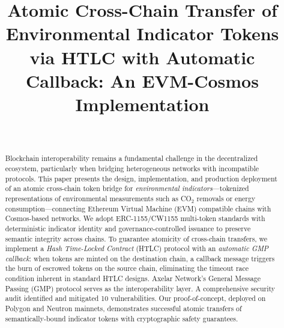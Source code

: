 \documentclass[conference,10pt]{IEEEtran}
\begin{document}
\title{Atomic Cross-Chain Transfer of Environmental Indicator Tokens via HTLC with Automatic Callback: An EVM-Cosmos Implementation}

\author{
    \\
}

\maketitle

\begin{abstract}
Blockchain interoperability remains a fundamental challenge in the decentralized ecosystem, particularly when bridging heterogeneous networks with incompatible protocols. This paper presents the design, implementation, and production deployment of an atomic cross-chain token bridge for \textit{environmental indicators}---tokenized representations of environmental measurements such as CO$_2$ removals or energy consumption---connecting Ethereum Virtual Machine (EVM) compatible chains with Cosmos-based networks. We adopt ERC-1155/CW1155 multi-token standards with deterministic indicator identity and governance-controlled issuance to preserve semantic integrity across chains. To guarantee atomicity of cross-chain transfers, we implement a \textit{Hash Time-Locked Contract} (HTLC) protocol with an \textit{automatic GMP callback}: when tokens are minted on the destination chain, a callback message triggers the burn of escrowed tokens on the source chain, eliminating the timeout race condition inherent in standard HTLC designs. Axelar Network's General Message Passing (GMP) protocol serves as the interoperability layer. A comprehensive security audit identified and mitigated 10 vulnerabilities. Our proof-of-concept, deployed on Polygon and Neutron mainnets, demonstrates successful atomic transfers of semantically-bound indicator tokens with cryptographic safety guarantees.
\end{abstract}
\end{document}
